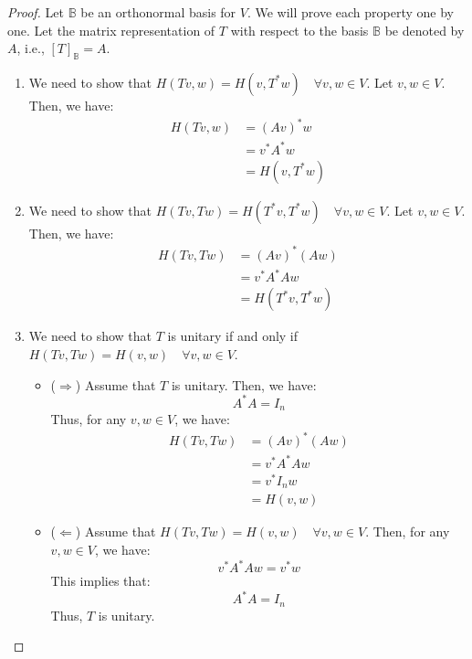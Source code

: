 \documentclass[openany]{book}
\begin{document}
\begin{proof}
    Let $\mathbb{B}$ be an orthonormal basis for $V$. We will prove each property one by one. Let the matrix representation of $T$ with respect to the basis $\mathbb{B}$ be denoted by $A$, i.e., $[T]_{\mathbb{B}} = A$.
    \begin{enumerate}
        \item We need to show that $H(Tv, w) = H(v, T^* w) \quad \forall v, w \in V$. Let $v, w \in V$. Then, we have:
        \[\begin{aligned}
        H(Tv, w) &= (Av)^* w \\
        &= v^* A^* w \\
        &= H(v, T^* w)
        \end{aligned}\]
        
        \item We need to show that $H(Tv, Tw) = H(T^*v, T^*w) \quad \forall v, w \in V$. Let $v, w \in V$. Then, we have:
        \[\begin{aligned}
        H(Tv, Tw) &= (Av)^* (Aw) \\
        &= v^* A^* A w \\
        &= H(T^*v, T^*w)
        \end{aligned}\]
        
        \item We need to show that $T$ is unitary if and only if $H(Tv, Tw) = H(v, w) \quad \forall v, w \in V$. 
        \begin{itemize}
            \item ($\Rightarrow$) Assume that $T$ is unitary. Then, we have:
            $$A^* A = I_n$$
            Thus, for any $v, w \in V$, we have:
            \[\begin{aligned}
            H(Tv, Tw) &= (Av)^* (Aw) \\
            &= v^* A^* A w \\
            &= v^* I_n w \\
            &= H(v, w)
            \end{aligned}\]
            
            \item ($\Leftarrow$) Assume that $H(Tv, Tw) = H(v, w) \quad \forall v, w \in V$. Then, for any $v, w \in V$, we have:
            $$v^* A^* A w = v^* w$$
            This implies that:
            $$A^* A = I_n$$
            Thus, $T$ is unitary.
        \end{itemize}
        

\end{enumerate}
\end{proof}
\end{document}
